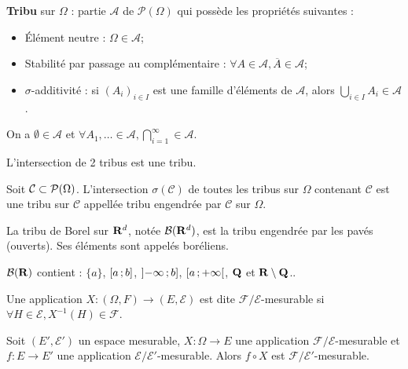 \begin{defn}
	\textbf{Tribu} sur $\Omega$ : partie $\mathcal{A}$ de $\mathcal{P}(\Omega)$ qui possède les propriétés suivantes :
	\begin{itemize}
		\item[\textbullet] Élément neutre : $\Omega \in \mathcal{A}$;
		\item[\textbullet] Stabilité par passage au complémentaire : $\forall A \in \mathcal{A}, \overline{A} \in \mathcal{A}$;
		\item[\textbullet] $\sigma$-additivité : si $(A_i)_{i \in I}$ est une famille d’éléments de $\mathcal{A}$, alors $\bigcup_{i \in I} A_i \in \mathcal{A}$.
	\end{itemize}
\end{defn}

\begin{pop}
	On a $\emptyset \in \mathcal{A}$ et $\forall A_1,\ldots \in \mathcal{A}, \bigcap_{i = 1}^{\infty} \in \mathcal{A}$.
\end{pop}

\begin{lem}
	L’intersection de 2 tribus est une tribu.
\end{lem}

\begin{thm}
	Soit $\mathcal{C} \subset \mathcal{P}(\Omega)$.
	L’intersection $\sigma(\mathcal{C})$ de toutes les tribus sur $\Omega$ contenant $\mathcal{C}$ est une tribu sur $\mathcal{C}$ appellée tribu engendrée par $\mathcal{C}$ sur $\Omega$.
\end{thm}

\begin{defn}
	La tribu de Borel sur $\mathbf{R}^d$, notée $\mathcal{B}(\mathbf{R}^d)$, est la tribu engendrée par les pavés (ouverts).
	Ses éléments sont appelés boréliens.
\end{defn}

\begin{thm}
	$\mathcal{B}(\mathbf{R})$ contient : $\{ a \}$, $\mathopen{}\mathclose{\left[a\mathclose{}\mathpunct{};b\right]}$, $\mathopen{}\mathclose{\left]-\infty\mathclose{}\mathpunct{};b\right]}$, $\mathopen{}\mathclose{\left[a\mathclose{}\mathpunct{};+\infty\right[}$, $\mathbf{Q}$ et $\mathbf{R} \setminus \mathbf{Q}$..
\end{thm}

\begin{defn}
	Une application $X \colon (\Omega,F) \to (E,\mathcal{E})$ est dite $\mathcal{F}/\mathcal{E}$-mesurable si $\forall H \in \mathcal{E}, X^{-1}(H) \in \mathcal{F}$.
\end{defn}

\begin{thm}
	Soit $(E',\mathcal{E}')$ un espace mesurable, $X \colon \Omega \to E$ une application $\mathcal{F}/\mathcal{E}$-mesurable et $f \colon E \to E'$ une application $\mathcal{E}/\mathcal{E}'$-mesurable.
	Alors $f \circ X$ est $\mathcal{F}/\mathcal{E}'$-mesurable.
\end{thm}

